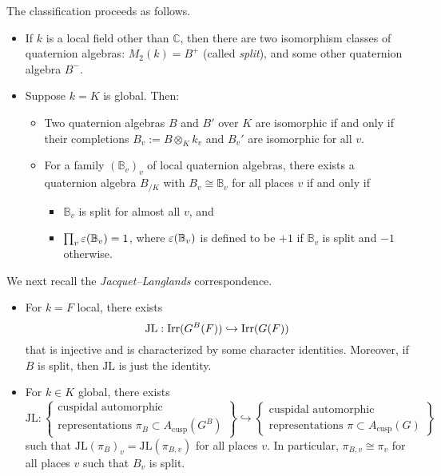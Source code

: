 \documentclass[reqno]{amsart} 
\numberwithin{theorem}{section}
\numberwithin{equation}{section}
\numberwithin{exercise}{section}
\begin{document}
The classification proceeds as follows.
\begin{itemize}
\item If $k$ is a local field other than $\mathbb{C}$, then there are two isomorphism classes of quaternion algebras: $M_2(k) = B^+$ (called \emph{split}), and some other quaternion algebra $B^-$.
\item Suppose $k = K$ is global.  Then:
  \begin{itemize}
  \item Two quaternion  algebras $B$ and $B'$ over $K$ are isomorphic if and only if their completions $B_v :=B \otimes_K k_v$ and $B_v '$ are isomorphic for all $v$.
  \item For a family $(\mathbb{B}_v)_v$ of local quaternion algebras, there exists a quaternion algebra $B_{/ K}$ with $B_v \cong \mathbb{B}_v$ for all places $v$ if and only if
    \begin{itemize}
    \item $\mathbb{B}_v$ is split for almost all $v$, and
    \item $\prod_v \varepsilon(\mathbb{B}_v) = 1$, where $\varepsilon(\mathbb{B}_v)$ is defined to be $+1$ if $\mathbb{B}_v$ is split and $- 1$ otherwise.
    \end{itemize}
  \end{itemize}
\end{itemize}
We next recall the \emph{Jacquet--Langlands} correspondence.
\begin{itemize}
\item For $k = F$ local, there exists
  \begin{equation*}
    \mathrm{JL} : \operatorname{Irr}(G^B(F)) \hookrightarrow \operatorname{Irr}(G(F))
  \end{equation*}
  that is injective and is characterized by some character identities.  Moreover, if $B$ is split, then $\mathrm{JL}$ is just the identity.
\item For $k \in K$ global, there exists
  \begin{equation*}
    \mathrm{JL} :
    \left\{
      \begin{array}{c}
        \text{cuspidal automorphic } \\
        \text{representations } \pi_B \subset A_{\mathrm{cusp}}(G^B)
      \end{array}
    \right\}
    \hookrightarrow 
    \left\{
      \begin{array}{c}
        \text{cuspidal automorphic } \\
        \text{representations } \pi \subset A_{\mathrm{cusp}}(G)
      \end{array}
    \right\}
  \end{equation*}
  such that $\mathrm{JL}(\pi_B)_v = \mathrm{JL}(\pi_{B, v})$ for all places $v$.  In particular, $\pi_{B, v} \cong \pi_v$ for all places $v$ such that $B_v$ is split.
\end{itemize}
\end{document}

